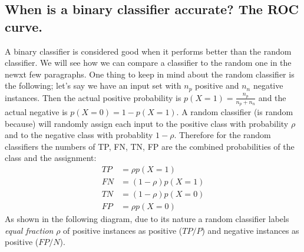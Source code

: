 \documentclass[a4paper]{article}
\begin{document}
\subsection{When is a binary classifier accurate? The ROC curve.}

A binary classifier is considered good when it performs better than the random classifier. We will see how we can compare a classifier to the random one in the newxt few paragraphs. One thing to keep in mind about the random classifier is the following; let's say we have an input set with $n_p$ positive and $n_n$ negative instances. Then the actual positive probability is $p(X=1) = \frac{n_p}{n_p+n_n}$ and the actual negative is $p(X=0) = 1 - p(X=1)$. A random classifier (is random because) will randomly assign each input to the positive class with probability $\rho$ and to the negative class with probablity $1-\rho$. Therefore for the random classifiers the numbers of TP, FN, TN, FP are the combined probabilities of the class and the assignment:
\begin{align}
    TP &= \rho p(X=1) \label{eq:random_class_tp}\\
    FN &= (1-\rho)p(X=1) \label{eq:random_class_fn}\\
    TN &= (1-\rho)p(X=0) \label{eq:random_class_tn}\\
    FP &= \rho p(X=0) \label{eq:random_class_fp}
\end{align}
As shown in the following diagram, due to its nature a random classifier labels \textit{equal fraction} $\rho$ of positive instances as positive ($TP/P$) and negative instances as positive ($FP/N$).
\end{document}

